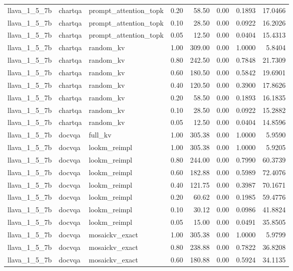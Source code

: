 \begin{longtable}{lllrrrrr}
llava\_1\_5\_7b & chartqa & prompt\_attention\_topk & 0.20 & 58.50 & 0.00 & 0.1893 & 17.0466 \\
llava\_1\_5\_7b & chartqa & prompt\_attention\_topk & 0.10 & 28.50 & 0.00 & 0.0922 & 16.2026 \\
llava\_1\_5\_7b & chartqa & prompt\_attention\_topk & 0.05 & 12.50 & 0.00 & 0.0404 & 15.4313 \\
llava\_1\_5\_7b & chartqa & random\_kv & 1.00 & 309.00 & 0.00 & 1.0000 & 5.8404 \\
llava\_1\_5\_7b & chartqa & random\_kv & 0.80 & 242.50 & 0.00 & 0.7848 & 21.7309 \\
llava\_1\_5\_7b & chartqa & random\_kv & 0.60 & 180.50 & 0.00 & 0.5842 & 19.6901 \\
llava\_1\_5\_7b & chartqa & random\_kv & 0.40 & 120.50 & 0.00 & 0.3900 & 17.8626 \\
llava\_1\_5\_7b & chartqa & random\_kv & 0.20 & 58.50 & 0.00 & 0.1893 & 16.1835 \\
llava\_1\_5\_7b & chartqa & random\_kv & 0.10 & 28.50 & 0.00 & 0.0922 & 15.2882 \\
llava\_1\_5\_7b & chartqa & random\_kv & 0.05 & 12.50 & 0.00 & 0.0404 & 14.8596 \\
llava\_1\_5\_7b & docvqa & full\_kv & 1.00 & 305.38 & 0.00 & 1.0000 & 5.9590 \\
llava\_1\_5\_7b & docvqa & lookm\_reimpl & 1.00 & 305.38 & 0.00 & 1.0000 & 5.9205 \\
llava\_1\_5\_7b & docvqa & lookm\_reimpl & 0.80 & 244.00 & 0.00 & 0.7990 & 60.3739 \\
llava\_1\_5\_7b & docvqa & lookm\_reimpl & 0.60 & 182.88 & 0.00 & 0.5989 & 72.4076 \\
llava\_1\_5\_7b & docvqa & lookm\_reimpl & 0.40 & 121.75 & 0.00 & 0.3987 & 70.1671 \\
llava\_1\_5\_7b & docvqa & lookm\_reimpl & 0.20 & 60.62 & 0.00 & 0.1985 & 59.4776 \\
llava\_1\_5\_7b & docvqa & lookm\_reimpl & 0.10 & 30.12 & 0.00 & 0.0986 & 41.8824 \\
llava\_1\_5\_7b & docvqa & lookm\_reimpl & 0.05 & 15.00 & 0.00 & 0.0491 & 35.8505 \\
llava\_1\_5\_7b & docvqa & mosaickv\_exact & 1.00 & 305.38 & 0.00 & 1.0000 & 5.9799 \\
llava\_1\_5\_7b & docvqa & mosaickv\_exact & 0.80 & 238.88 & 0.00 & 0.7822 & 36.8208 \\
llava\_1\_5\_7b & docvqa & mosaickv\_exact & 0.60 & 180.88 & 0.00 & 0.5924 & 34.1135 \\

\end{longtable}

